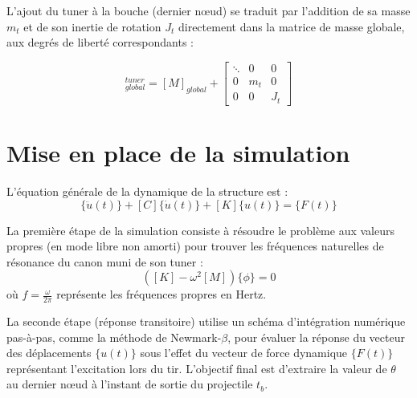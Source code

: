 \documentclass[12pt,a4paper]{article}
\begin{document}
	L'ajout du tuner à la bouche (dernier nœud) se traduit par l'addition de sa masse $m_t$ et de son inertie de rotation $J_t$ directement dans la matrice de masse globale, aux degrés de liberté correspondants :
	
	\begin{equation}
		[M]_{global}^{tuner} = [M]_{global} + 
		\begin{bmatrix} 
			\ddots & 0 & 0 \\ 
			0 & m_t & 0 \\ 
			0 & 0 & J_t 
		\end{bmatrix}
	\end{equation}
	
	\section{Mise en place de la simulation}
	
	L'équation générale de la dynamique de la structure est :
	\begin{equation}
		[M]\{\ddot{u}(t)\} + [C]\{\dot{u}(t)\} + [K]\{u(t)\} = \{F(t)\}
	\end{equation}
	
	La première étape de la simulation consiste à résoudre le problème aux valeurs propres (en mode libre non amorti) pour trouver les fréquences naturelles de résonance du canon muni de son tuner :
	\begin{equation}
		\left( [K] - \omega^2 [M] \right) \{\phi\} = 0
	\end{equation}
	où $f = \frac{\omega}{2\pi}$ représente les fréquences propres en Hertz.
	
	La seconde étape (réponse transitoire) utilise un schéma d'intégration numérique pas-à-pas, comme la méthode de Newmark-$\beta$, pour évaluer la réponse du vecteur des déplacements $\{u(t)\}$ sous l'effet du vecteur de force dynamique $\{F(t)\}$ représentant l'excitation lors du tir. L'objectif final est d'extraire la valeur de $\theta$ au dernier nœud à l'instant de sortie du projectile $t_b$.
	
\end{document}
